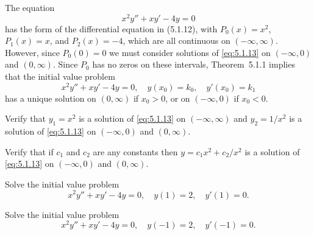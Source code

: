 \setcounter{example}{2}
\setcounter{equation}{12}
\begin{example}
  \label{example:5.1.3} \rm The equation
  \begin{equation}
    \label{eq:5.1.13}x^{2}y''+xy'-4y=0
  \end{equation}
  has the form of the differential equation in \textup{(5.1.12)}, with $P_{0}(x)=x^{2}$,
  $P_{1}(x)=x$, and $P_{2}(x)=-4$, which are all continuous on $(-\infty,\infty)$. However, since
  $P_{0}(0)=0$ we must consider solutions of \eqref{eq:5.1.13} on $(-\infty,0)$ and $(0,\infty)$. Since
  $P_{0}$ has no zeros on these intervals, Theorem~5.1.1 implies that the initial
  value problem
  \[
    x^{2}y''+xy'-4y=0,\quad y(x_{0})=k_{0},\quad y'(x_{0})=k_{1}
  \]
  has a unique solution on $(0,\infty)$ if $x_{0}>0$, or on $(-\infty,0)$ if $x_{0}<0$.
  \begin{alist}
    \item %
    Verify that $y_{1}=x^{2}$ is a solution of \eqref{eq:5.1.13} on $(-\infty,\infty)$ and
    $y_{2}=1/x^{2}$ is a solution of \eqref{eq:5.1.13} on $(-\infty,0)$ and $(0,\infty)$.

    \item %
    Verify that if $c_{1}$ and $c_{2}$ are any constants then $y=c_{1}x^{2}+c_{2}/x^{2}$ is a
    solution of \eqref{eq:5.1.13} on $(-\infty,0)$ and $(0,\infty)$.

    \item %
    Solve the initial value problem
    \begin{equation}
      \label{eq:5.1.14}x^{2}y''+xy'-4y=0,\quad y(1)=2,\quad y'(1)=0.
    \end{equation}

    \item %
    Solve the initial value problem
    \begin{equation}
      \label{eq:5.1.15}x^{2}y''+xy'-4y=0,\quad y(-1)=2,\quad y'(-1)=0.
    \end{equation}
  \end{alist}
\end{example}
\setcounter{equation}{15}
